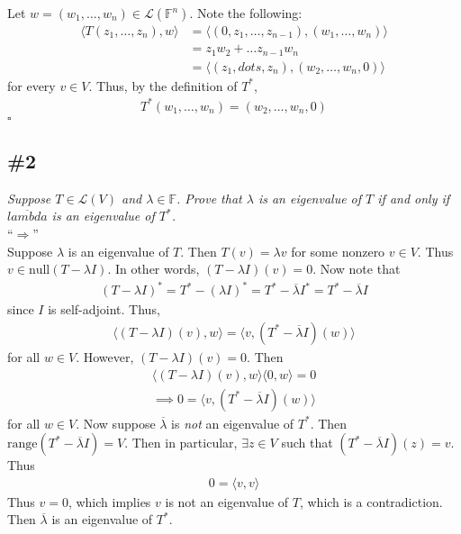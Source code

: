 \documentclass[12pt]{article}
\begin{document}
\noindent Let $w = (w_1, \dots, w_n) \in \mathcal{L}(\mathbb{F}^n)$.  Note the following:
\begin{align*}
	\langle T(z_1, \dots, z_n), w \rangle &= \langle (0, z_1, \dots, z_{n-1}), (w_1, \dots, w_n) \rangle \\
	&= z_1w_2 + \dots z_{n-1}w_n \\
	&= \langle (z_1, dots, z_n), (w_2, \dots, w_n, 0) \rangle
\end{align*}
for every $v \in V$.  Thus, by the definition of $T^*$,
\begin{align*}
	T^*(w_1, \dots, w_n) = (w_2, \dots, w_n, 0)
\end{align*}
\hfill $\square$

\subsection*{\#2}
{\it Suppose $T \in \mathcal{L}(V)$ and $\lambda \in \mathbb{F}$.  Prove that $\lambda$ is an eigenvalue of $T$ if and only if $\overline{lambda}$ is an eigenvalue of $T^*$.} \\

\noindent ``$\Longrightarrow$'' \\
Suppose $\lambda$ is an eigenvalue of $T$.  Then $T(v) = \lambda v$ for some nonzero $v \in V$.  Thus $v \in \text{null}(T - \lambda I)$.  In other words, $(T - \lambda I)(v) = 0$.  Now note that
\begin{align*}
	(T - \lambda I)^* = T^* - (\lambda I)^* = T^* - \overline{\lambda}I^* = T^* - \overline{\lambda}I
\end{align*}
since $I$ is self-adjoint.  Thus,
\begin{align*}
	\langle (T - \lambda I)(v), w \rangle = \langle v, (T^* - \overline{\lambda}I)(w) \rangle
\end{align*}
for all $w \in V$.  However, $(T - \lambda I)(v) = 0$.  Then
\begin{align*}
	\langle (T - \lambda I)(v), w \rangle \langle 0, w \rangle = 0 \\
	\implies 0 = \langle v, (T^* - \overline{\lambda}I)(w) \rangle
\end{align*}
for all $w \in V$.  Now suppose $\overline{\lambda}$ is {\it not} an eigenvalue of $T^*$.  Then $\text{range}(T^* - \overline{\lambda}I) = V$.  Then in particular, $\exists z \in V$ such that $(T^* - \overline{\lambda}I)(z) = v$.  Thus
\begin{align*}
	0 = \langle v, v \rangle
\end{align*}
Thus $v = 0$, which implies $v$ is not an eigenvalue of $T$, which is a contradiction.  Then $\overline{\lambda}$ is an eigenvalue of $T^*$. \\
\end{document}
